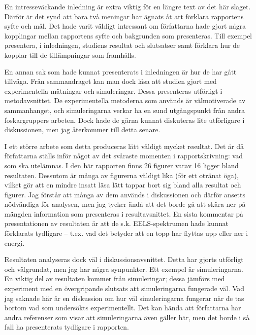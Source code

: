 \documentclass[11pt,a4paper, english, swedish
]{article}
\begin{document}
En intresseväckande inledning är extra viktig för en längre text av det här slaget. Därför är det synd att bara två meningar har ägnats åt att förklara rapportens syfte och mål. Det hade varit väldigt intressant om författarna hade gjort några kopplingar mellan rapportens syfte och bakgrunden som presenteras. Till exempel presentera, i inledningen, studiens resultat och slutsatser samt förklara hur de kopplar till de tillämpningar som framhålls.

En annan sak som hade kunnat presenterats i inledningen är hur de har gått tillväga. Från sammandraget kan man dock läsa att studien gjort med experimentella mätningar och simuleringar. Dessa presenteras utförligt i metodavsnittet. De experimentella metoderna som används är välmotiverade av sammanhanget, och simuleringarna verkar ha en sund utgångspunkt från andra foskargruppers arbeten.
Dock hade de gärna kunnat diskuteras lite utförligare i diskussionen, men jag återkommer till detta senare. 

I ett större arbete som detta produceras lätt väldigt mycket resultat. Det är då  författarna ställs inför något av det svåraste momenten i rapportskrivning: vad som ska utelämnas. I den här rapporten finns 26 figurer varav 16 ligger bland resultaten. Dessutom är många av figurerna väldigt lika (för ett otränat öga), vilket gör att en mindre insatt läsa lätt tappar bort sig bland alla resultat och figurer. Jag förstår att många av dem används i diskussionen och därför ansetts nödvändiga för analysen, men jag tycker ändå att det borde gå att skära ner på mängden information som presenteras i resultavsnittet. En sista kommentar på presentationen av resultaten är att de s.k. EELS-spektrumen hade kunnat förklarats tydligare -- t.ex. vad det betyder att en topp har flyttas upp eller ner i energi. 

Resultaten analyseras dock väl i diskussionsavsnittet. Detta har gjorts utförligt och välgrundat, men jag har några synpunkter. Ett exempel är simuleringarna. En viktig del av resultaten kommer från simuleringar; dessa jämförs med experiment med en övergripande slutsats att simuleringarna fungerade väl. Vad jag saknade här är en diskussion om hur väl simuleringarna fungerar när de tas bortom vad som undersökts experimentellt. 
Det kan hända att författarna har andra referenser som visar att simuleringarna även gäller här, men det borde i så fall ha presenterats tydligare i rapporten. 
\\[1cm]
\end{document}
